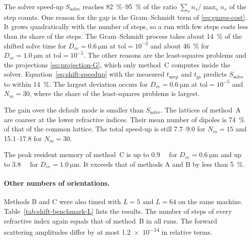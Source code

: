 \documentclass[11pt,a4paper]{article}
\begin{document}
The solver speed-up $S_{\text{solve}}$ reaches \SIrange{82}{95}{\percent}
of the ratio $\sum_s n_s / \max_s n_s$ of the step counts.
One reason for the gap is the Gram--Schmidt term of
\eqref{eq:gmres-cost}.
It grows quadratically with the number of steps, so a run with few
steps costs less than its share of the steps.
The Gram--Schmidt process takes about \SI{14}{\percent} of the shifted
solve time for $D_{ve} = \SI{0.6}{\micro\meter}$ at
$\text{tol} = 10^{-2}$ and about \SI{46}{\percent} for
$D_{ve} = \SI{1.0}{\micro\meter}$ at $\text{tol} = 10^{-5}$.
The other reasons are the least-squares problems and the projections
\eqref{eq:projection-G}, which only method~C computes inside the solver.
Equation~\eqref{eq:shift-speedup} with the measured $t_{\text{mvp}}$ and
$t_{\text{gs}}$ predicts $S_{\text{solve}}$ to within \SI{14}{\percent}.
The largest deviation occurs for $D_{ve} = \SI{0.6}{\micro\meter}$ at
$\text{tol} = 10^{-5}$ and $N_m = 30$, where the share of the
least-squares problems is largest.

The gain over the default mode is smaller than $S_{\text{solve}}$.
The lattices of method~A are coarser at the lower refractive indices.
Their mean number of dipoles is \SI{74}{\percent} of that of the common
lattice.
The total speed-up is still \numrange{7.7}{9.0} for $N_m = 15$ and
\numrange{15.1}{17.8} for $N_m = 30$.

The peak resident memory of method~C is up to \SI{0.9}{\gibi\byte} for
$D_{ve} = \SI{0.6}{\micro\meter}$ and up to \SI{3.8}{\gibi\byte} for
$D_{ve} = \SI{1.0}{\micro\meter}$.
It exceeds that of methods A and B by less than \SI{5}{\percent}.

\paragraph{Other numbers of orientations.}
Methods B and C were also timed with $L = 5$ and $L = 64$ on the same
machine.
Table~\ref{tab:shift-benchmark-L} lists the results.
The number of steps of every refractive index again equals that of
method~B in all runs.
The forward scattering amplitudes differ by at most \num{1.2e-14} in
relative terms.
\end{document}
